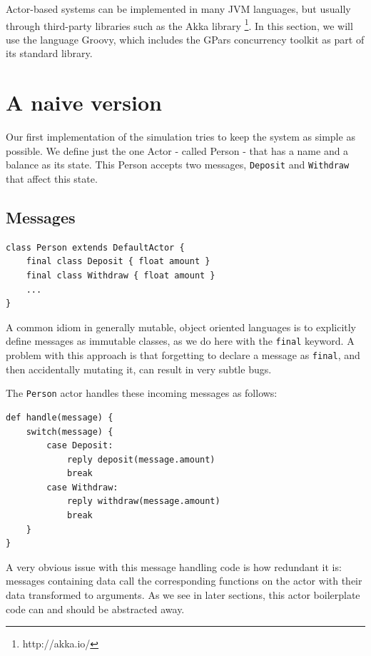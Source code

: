 \documentclass[a4paper,12pt]{kth-mag}
\begin{document}
Actor-based systems can be implemented in many JVM languages, but usually through third-party libraries such as the Akka library \footnote{http://akka.io/}. In this section, we will use the language Groovy, which includes the GPars concurrency toolkit as part of its standard library.

\section{A naive version}

Our first implementation of the simulation tries to keep the system as simple as possible. We define just the one Actor - called Person - that has a name and a balance as its state. This Person accepts two messages, \texttt{Deposit} and \texttt{Withdraw} that affect this state. 

\subsection{Messages}

\begin{listing}[H]
	\begin{verbatim}
class Person extends DefaultActor {
    final class Deposit { float amount }
    final class Withdraw { float amount }
    ...
}
	\end{verbatim}
\end{listing}

A common idiom in generally mutable, object oriented languages is to explicitly define messages as immutable classes, as we do here with the \texttt{final} keyword. A problem with this approach is that forgetting to declare a message as \texttt{final}, and then accidentally mutating it, can result in very subtle bugs.

The \texttt{Person} actor handles these incoming messages as follows:

\begin{listing}[H]
	\begin{verbatim}
def handle(message) { 
    switch(message) {
        case Deposit:
            reply deposit(message.amount)
            break
        case Withdraw: 
            reply withdraw(message.amount)
            break
    }
}
	\end{verbatim}
\end{listing}

A very obvious issue with this message handling code is how redundant it is: messages containing data call the corresponding functions on the actor with their data transformed to arguments. As we see in later sections, this actor boilerplate code can and should be abstracted away.
\end{document}
